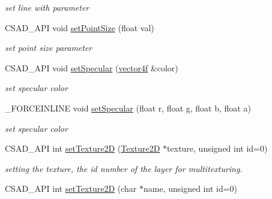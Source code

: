 \begin{DoxyCompactItemize}
\begin{DoxyCompactList}\small\item\em set line with parameter \end{DoxyCompactList}\item 
\hypertarget{classcsad_1_1_material_a5c270b64f924b16f4c7fd3769c281aea}{C\-S\-A\-D\-\_\-\-A\-P\-I void \hyperlink{classcsad_1_1_material_a5c270b64f924b16f4c7fd3769c281aea}{set\-Point\-Size} (float val)}\label{classcsad_1_1_material_a5c270b64f924b16f4c7fd3769c281aea}

\begin{DoxyCompactList}\small\item\em set point size parameter \end{DoxyCompactList}\item 
\hypertarget{classcsad_1_1_material_a8ed3e9ebe5332050223218fa01855f4d}{C\-S\-A\-D\-\_\-\-A\-P\-I void \hyperlink{classcsad_1_1_material_a8ed3e9ebe5332050223218fa01855f4d}{set\-Specular} (\hyperlink{classbt_1_1vector4f}{vector4f} \&color)}\label{classcsad_1_1_material_a8ed3e9ebe5332050223218fa01855f4d}

\begin{DoxyCompactList}\small\item\em set specular color \end{DoxyCompactList}\item 
\hypertarget{classcsad_1_1_material_a64c90cd4ca7d5bb8c6966d3eba7dcf06}{\-\_\-\-F\-O\-R\-C\-E\-I\-N\-L\-I\-N\-E void \hyperlink{classcsad_1_1_material_a64c90cd4ca7d5bb8c6966d3eba7dcf06}{set\-Specular} (float r, float g, float b, float a)}\label{classcsad_1_1_material_a64c90cd4ca7d5bb8c6966d3eba7dcf06}

\begin{DoxyCompactList}\small\item\em set specular color \end{DoxyCompactList}\item 
\hypertarget{classcsad_1_1_material_a70d15f44aaa33b668b6e832aab38984b}{C\-S\-A\-D\-\_\-\-A\-P\-I int \hyperlink{classcsad_1_1_material_a70d15f44aaa33b668b6e832aab38984b}{set\-Texture2\-D} (\hyperlink{classcsad_1_1_texture2_d}{Texture2\-D} $\ast$texture, unsigned int id=0)}\label{classcsad_1_1_material_a70d15f44aaa33b668b6e832aab38984b}

\begin{DoxyCompactList}\small\item\em setting the texture, the id number of the layer for multitexturing. \end{DoxyCompactList}\item 
\hypertarget{classcsad_1_1_material_afaf6612ca664c0073a7e6d6d15a1185e}{C\-S\-A\-D\-\_\-\-A\-P\-I int \hyperlink{classcsad_1_1_material_afaf6612ca664c0073a7e6d6d15a1185e}{set\-Texture2\-D} (char $\ast$name, unsigned int id=0)}\label{classcsad_1_1_material_afaf6612ca664c0073a7e6d6d15a1185e}


\end{DoxyCompactItemize}
